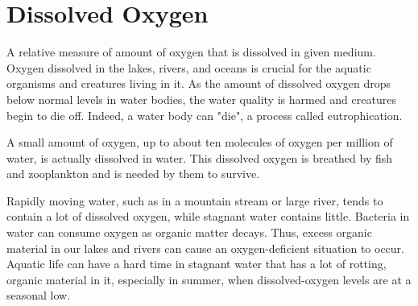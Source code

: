 \documentclass[a4paper]{article}
\begin{document}
\begin{minipage}[t]{0.45\textwidth}
\section*{\small Dissolved Oxygen}
{\normalsize A relative measure of amount of oxygen that is dissolved in given medium. Oxygen dissolved in the lakes, rivers, and oceans is crucial for the aquatic organisms and creatures living in it.
As the amount of dissolved oxygen drops below normal levels in water bodies, the water quality is harmed and creatures begin to die off. Indeed, a water body can "die", a process called eutrophication.\\ \par
A small amount of oxygen, up to about ten molecules of oxygen per million of water, is actually dissolved in water. This dissolved oxygen is breathed by fish and zooplankton and is needed by them to survive.\\ \par
Rapidly moving water, such as in a mountain stream or large river, tends to contain a lot of dissolved oxygen, while stagnant water contains little. Bacteria in water can consume oxygen as organic matter decays. Thus, excess organic material in our lakes and rivers can cause an oxygen-deficient situation to occur. Aquatic life can have a hard time in stagnant water that has a lot of rotting, organic material in it, especially in summer, when dissolved-oxygen levels are at a seasonal low.}
\end{minipage}  
\newpage
\end{document}
